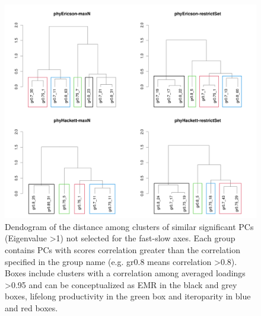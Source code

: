\begin{figure}[ht!]
\centering
\includegraphics[width=.8\textwidth]{./Figures/Appendix2_1/2nd axes trees-1.png}
\caption[Cluster dendogram of the secondary axes]{
Dendogram of the distance among clusters of similar significant PCs (Eigenvalue
\textgreater{1}) not selected for the fast-slow axes. Each group contains PCs
with scores correlation greater than the correlation specified in the group name
(e.g. gr0.8 means correlation \textgreater{0.8}). Boxes include clusters with a
correlation among averaged loadings \textgreater{0.95} and can be conceptualized
as EMR in the black and grey boxes, lifelong productivity in the green box and
iteroparity in blue and red boxes.}
\label{fig:figApp2.5}
\end{figure}
